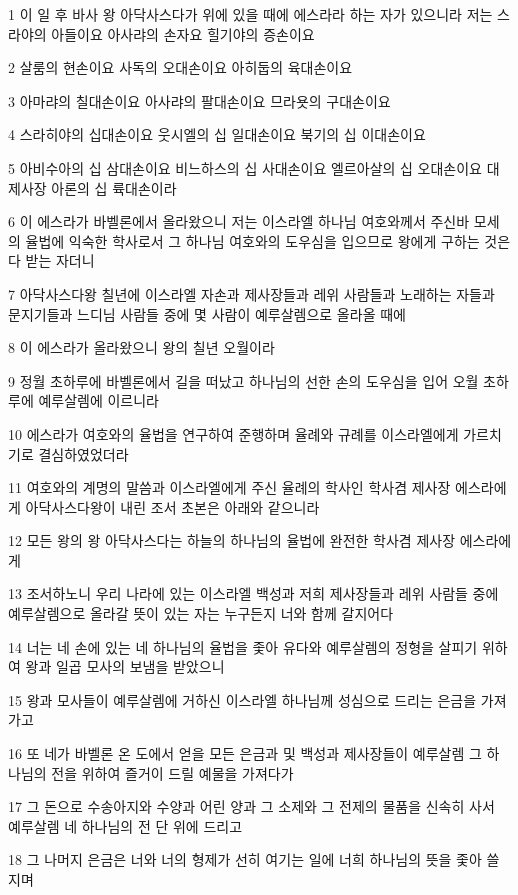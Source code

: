 \par 1 이 일 후 바사 왕 아닥사스다가 위에 있을 때에 에스라라 하는 자가 있으니라 저는 스라야의 아들이요 아사랴의 손자요 힐기야의 증손이요
\par 2 살룸의 현손이요 사독의 오대손이요 아히둡의 육대손이요
\par 3 아마랴의 칠대손이요 아사랴의 팔대손이요 므라욧의 구대손이요
\par 4 스라히야의 십대손이요 웃시엘의 십 일대손이요 북기의 십 이대손이요
\par 5 아비수아의 십 삼대손이요 비느하스의 십 사대손이요 엘르아살의 십 오대손이요 대제사장 아론의 십 륙대손이라
\par 6 이 에스라가 바벨론에서 올라왔으니 저는 이스라엘 하나님 여호와께서 주신바 모세의 율법에 익숙한 학사로서 그 하나님 여호와의 도우심을 입으므로 왕에게 구하는 것은 다 받는 자더니
\par 7 아닥사스다왕 칠년에 이스라엘 자손과 제사장들과 레위 사람들과 노래하는 자들과 문지기들과 느디님 사람들 중에 몇 사람이 예루살렘으로 올라올 때에
\par 8 이 에스라가 올라왔으니 왕의 칠년 오월이라
\par 9 정월 초하루에 바벨론에서 길을 떠났고 하나님의 선한 손의 도우심을 입어 오월 초하루에 예루살렘에 이르니라
\par 10 에스라가 여호와의 율법을 연구하여 준행하며 율례와 규례를 이스라엘에게 가르치기로 결심하였었더라
\par 11 여호와의 계명의 말씀과 이스라엘에게 주신 율례의 학사인 학사겸 제사장 에스라에게 아닥사스다왕이 내린 조서 초본은 아래와 같으니라
\par 12 모든 왕의 왕 아닥사스다는 하늘의 하나님의 율법에 완전한 학사겸 제사장 에스라에게
\par 13 조서하노니 우리 나라에 있는 이스라엘 백성과 저희 제사장들과 레위 사람들 중에 예루살렘으로 올라갈 뜻이 있는 자는 누구든지 너와 함께 갈지어다
\par 14 너는 네 손에 있는 네 하나님의 율법을 좇아 유다와 예루살렘의 정형을 살피기 위하여 왕과 일곱 모사의 보냄을 받았으니
\par 15 왕과 모사들이 예루살렘에 거하신 이스라엘 하나님께 성심으로 드리는 은금을 가져가고
\par 16 또 네가 바벨론 온 도에서 얻을 모든 은금과 및 백성과 제사장들이 예루살렘 그 하나님의 전을 위하여 즐거이 드릴 예물을 가져다가
\par 17 그 돈으로 수송아지와 수양과 어린 양과 그 소제와 그 전제의 물품을 신속히 사서 예루살렘 네 하나님의 전 단 위에 드리고
\par 18 그 나머지 은금은 너와 너의 형제가 선히 여기는 일에 너희 하나님의 뜻을 좇아 쓸지며
